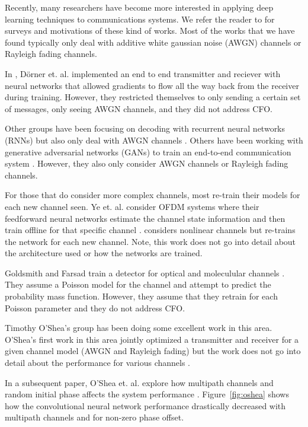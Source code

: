 Recently, many researchers have become more interested in applying deep learning techniques to communications systems.  
We refer the reader to \cite{botoca}\cite{diamandis}\cite{wang}\cite{hemodel}\cite{osheaphys} for surveys and motivations of these kind of works.  
Most of the works that we have found typically only deal with additive white gaussian noise (AWGN) channels or Rayleigh fading channels.

In \cite{dorner2017}, D\"{o}rner et. al. implemented an end to end transmitter and reciever with neural networks that allowed gradients to flow all the way back from the receiver during training.  
However, they restricted themselves to only sending a certain set of messages, only seeing AWGN channels, and they did not address CFO. 

Other groups have been focusing on decoding with recurrent neural networks (RNNs) but also only deal with AWGN channels \cite{kim2018}\cite{kimnips}.  
Others have been working with generative adversarial networks (GANs) to train an end-to-end communication system \cite{yegans}.  However, they also only consider AWGN channels or Rayleigh fading channels.

For those that do consider more complex channels, most re-train their models for each new channel seen.  Ye et. al. consider OFDM systems where their feedforward neural networks estimate the channel state information and then train offline for that specific channel \cite{ye2018}.  
\cite{raghavendra} considers nonlinear channels but re-trains the network for each new channel.  Note, this work does not go into detail about the architecture used or how the networks are trained. 

Goldsmith and Farsad train a detector for optical and moleculular channels \cite{farsad2018}.  They assume a Poisson model for the channel and attempt to predict the probability mass function.  However, they assume that they retrain for each Poisson parameter and they do not address CFO.

Timothy O'Shea's group has been doing some excellent work in this area. 
O'Shea's first work in this area jointly optimized a transmitter and receiver for a given channel model (AWGN and Rayleigh fading) but the work does not go into detail about the performance for various channels \cite{osheaphys}.

In a subsequent paper, O'Shea et. al. explore how multipath channels and random initial phase affects the system performance \cite{osheaatt}.  Figure~\ref{fig:oshea} shows how the convolutional neural network performance drastically decreased with multipath channels and for non-zero phase offset.

